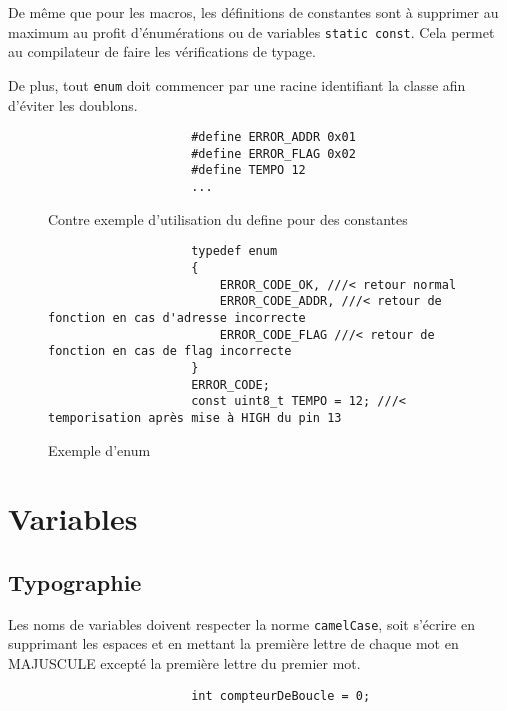 			De même que pour les macros, les définitions de constantes sont à supprimer au maximum au profit d’énumérations ou de variables \verb+static const+. Cela permet au compilateur de faire les vérifications de typage.

			De plus, tout \verb+enum+ doit commencer par une racine identifiant la classe afin d’éviter les doublons.
			
			\begin{figure}[H]
				\begin{changemargin}{-2.5cm}{-2.5cm}
				\begin{tcolorbox}
				\begin{verbatim}
					#define ERROR_ADDR 0x01
					#define ERROR_FLAG 0x02
					#define TEMPO 12
					...
				\end{verbatim}
				\end{tcolorbox}
				\end{changemargin}
				\caption{Contre exemple d'utilisation du define pour des constantes}
				
				\begin{changemargin}{-2.5cm}{-2.5cm}
				\begin{tcolorbox}
				\begin{verbatim}
					typedef enum
					{
					    ERROR_CODE_OK, ///< retour normal
					    ERROR_CODE_ADDR, ///< retour de fonction en cas d'adresse incorrecte
					    ERROR_CODE_FLAG ///< retour de fonction en cas de flag incorrecte
					}
					ERROR_CODE;
					const uint8_t TEMPO = 12; ///< temporisation après mise à HIGH du pin 13
				\end{verbatim}
				\end{tcolorbox}
				\end{changemargin}
				\caption{Exemple d'enum}
			\end{figure}

	\section{Variables}
		\subsection{Typographie}
			Les noms de variables doivent respecter la norme \verb+camelCase+, soit s'écrire en supprimant les espaces et en mettant la première lettre de chaque mot en MAJUSCULE excepté la première lettre du premier mot.

			\begin{figure}[H]
				\begin{changemargin}{-2.5cm}{-2.5cm}
				\begin{tcolorbox}
				\begin{verbatim}
					int compteurDeBoucle = 0;
				\end{verbatim}
				\end{tcolorbox}
				\end{changemargin}
			\end{figure}

